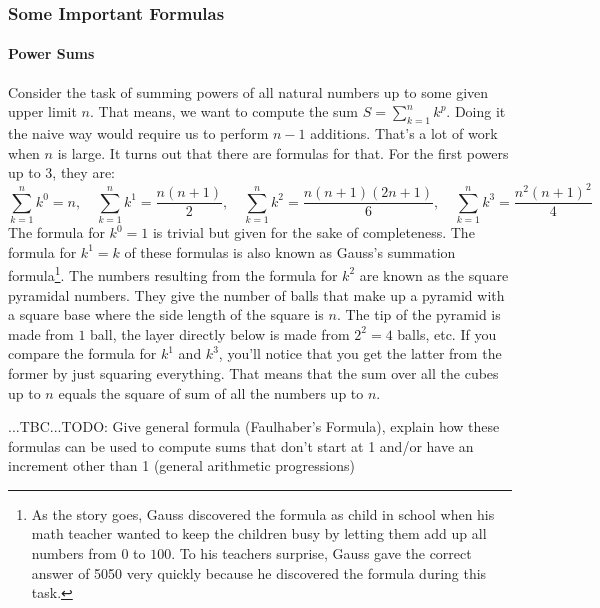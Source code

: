 \subsubsection{Some Important Formulas}

\paragraph{Power Sums}
Consider the task of summing powers of all natural numbers up to some given upper limit $n$. That means, we want to compute the sum $S = \sum_{k=1}^{n} k^p$. Doing it the naive way would require us to perform $n-1$ additions. That's a lot of work when $n$ is large. It turns out that there are formulas for that. For the first powers up to 3, they are:
\begin{equation}
\sum_{k=1}^{n} k^0 = n, \quad
\sum_{k=1}^{n} k^1 = \frac{n (n+1)}{2}, \quad
\sum_{k=1}^{n} k^2 = \frac{n (n+1) (2 n  + 1) }{6}, \quad
\sum_{k=1}^{n} k^3 = \frac{n^2 (n+1)^2}{4}
\end{equation}
The formula for $k^0 = 1$ is trivial but given for the sake of completeness. The formula for $k^1 = k$ of these formulas is also known as Gauss's summation formula\footnote{As the story goes, Gauss discovered the formula as child in school when his math teacher wanted to keep the children busy by letting them add up all numbers from $0$ to $100$. To his teachers surprise, Gauss gave the correct answer of 5050 very quickly because he discovered the formula during this task.}. The numbers resulting from the formula for $k^2$ are known as the square pyramidal numbers. They give the number of balls that make up a pyramid with a square base where the side length of the square is $n$. The tip of the pyramid is made from $1$ ball, the layer directly below is made from $2^2 = 4$ balls, etc. If you compare the formula for $k^1$ and $k^3$, you'll notice that you get the latter from the former by just squaring everything. That means that the sum over all the cubes up to $n$ equals the square of sum of all the numbers up to $n$.

...TBC...TODO: Give general formula (Faulhaber's Formula), explain how these formulas can be used to compute sums that don't start at 1 and/or have an increment other than 1 (general arithmetic progressions)




